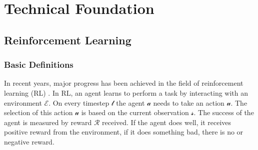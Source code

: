 %
%

\chapter{Technical Foundation}\label{chap.grundlagen}
\section{Reinforcement Learning}\label{reinforcementlearning}
\subsection*{Basic Definitions}\label{basic_rl_definitions}
In recent years, major progress has been achieved in the field of reinforcement learning (RL) \cite{mnih2013playing,alphazero,hideandseek}.
In RL, an agent learns to perform a task by interacting with an environment $\mathcal{E}$. On every timestep $\mathcal{t}$ the agent $\mathcal{a}$ needs to take an action $\mathcal{u}$. The selection of this action $\mathcal{u}$ is based on the current observation $\mathcal{s}$. The success of the agent is measured by reward $\mathcal{R}$ received. If the agent does well, it receives positive reward from the environment, if it does something bad, there is no or negative reward.

